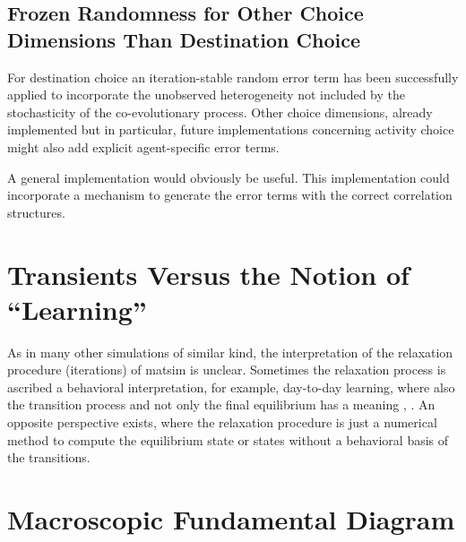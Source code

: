 
\subsection{Frozen Randomness for Other Choice Dimensions Than Destination Choice}
For destination choice an iteration-stable random error term has been successfully applied to incorporate the unobserved heterogeneity not included by the stochasticity of the co-evolutionary process. Other choice dimensions, already implemented but in particular, future implementations concerning activity choice might also add explicit agent-specific error terms.  

A general implementation would obviously be useful. 
This implementation could incorporate a mechanism to generate the error terms with the correct correlation structures. 

\section{Transients Versus the Notion of \enquote{Learning}}
\label{sec:transients-vs-learning}

As in many other simulations of similar kind, the interpretation of the relaxation procedure (iterations) of \gls{matsim} is unclear. 
%
Sometimes the relaxation process is ascribed a behavioral interpretation, for example, day-to-day learning, where also the transition process and not only the final equilibrium has a meaning \citep[][p.128]{LiuEtAl_TransResA_2006}, \citep[][p.523]{NagelBarrett1997feedback}. 
%
An opposite perspective exists, where the relaxation procedure is just a numerical method to compute the equilibrium state or states without a behavioral basis of the transitions.


\section{Macroscopic Fundamental Diagram}
\label{sec:researchavenues-mfd}


